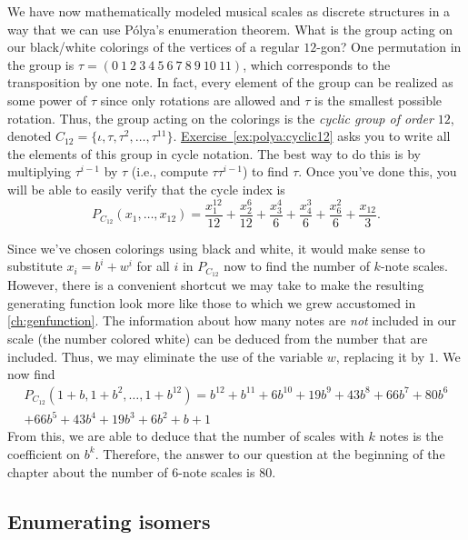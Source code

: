 We have now mathematically modeled musical scales as discrete
structures in a way that we can use P\'olya's enumeration
theorem. What is the group acting on our black/white colorings of the
vertices of a regular $12$-gon? One permutation in the group is $\tau
= (0\ 1\ 2\ 3\ 4\ 5\ 6\ 7\ 8\ 9\ 10\ 11)$, which corresponds to the
transposition by one note. In fact, every element of the group can be
realized as some power of $\tau$ since only rotations are allowed and
$\tau$ is the smallest possible rotation. Thus, the group acting on
the colorings is the \emph{cyclic group of order $12$}, denoted
$C_{12} =
\{\iota,\tau,\tau^2,\dots,\tau^{11}\}$. \hyperref[ex:polya:cyclic12]{Exercise~\ref*{ex:polya:cyclic12}}
asks you to write all the elements of this group in cycle
notation. The best way to do this is by multiplying $\tau^{i-1}$ by
$\tau$ (i.e., compute $\tau\tau^{i-1}$) to find $\tau$. Once you've
done this, you will be able to easily verify that the cycle index is
\[P_{C_{12}}(x_1,\dots,x_{12}) = \frac{x_1^{12}}{12}+\frac{x_2^6}{12}+\frac{x_3^4}{6}+\frac{x_4^3}{6}+\frac{x_6^2}{6}+\frac{x_{12}}{3}.\]

Since we've chosen colorings using black and white, it would make
sense to substitute $x_i = b^i +w^i$ for all $i$ in $P_{C_{12}}$ now
to find the number of $k$-note scales. However, there is a convenient
shortcut we may take to make the resulting generating function look
more like those to which we grew accustomed in
\autoref{ch:genfunction}. The information about how many notes are
\emph{not} included in our scale (the number colored white) can be
deduced from the number that are included. Thus, we may eliminate the
use of the variable $w$, replacing it by $1$. We now find
\begin{multline*}P_{C_{12}}(1+b,1+b^2,\dots,1+b^{12}) = b^{12}+b^{11}+6 b^{10}+19 b^9+43 b^8+66 b^7+80 b^6\\+66 b^5+43 b^4+19 b^3+6 b^2+b+1\end{multline*}
From this, we are able to deduce that the number of scales with $k$
notes is the coefficient on $b^k$. Therefore, the answer to our
question at the beginning of the chapter about the number of $6$-note
scales is $80$.

\subsection{Enumerating isomers}\label{ss:polya:isomers}

